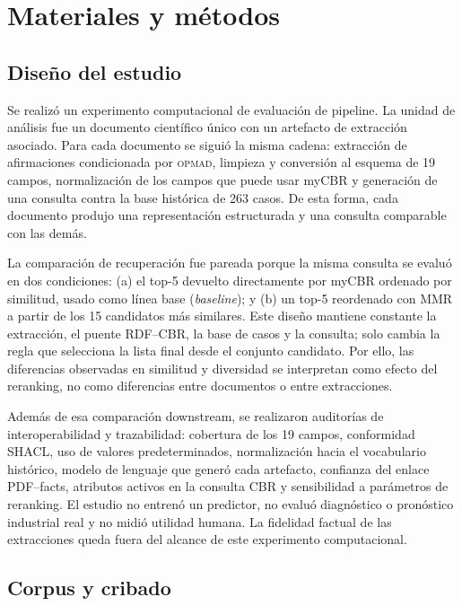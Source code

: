 \documentclass[11pt,a4paper]{article}
\newcommand{\OPMAD}{\textsc{opmad}}
\newcommand{\myCBR}{myCBR}
\begin{document}
\section{Materiales y métodos}
\label{sec:methods}

\subsection{Diseño del estudio}

Se realizó un experimento computacional de evaluación de pipeline. La unidad de análisis fue un documento científico único con un artefacto de extracción asociado. Para cada documento se siguió la misma cadena: extracción de afirmaciones condicionada por \OPMAD{}, limpieza y conversión al esquema de 19 campos, normalización de los campos que puede usar \myCBR{} y generación de una consulta contra la base histórica de 263 casos. De esta forma, cada documento produjo una representación estructurada y una consulta comparable con las demás.

La comparación de recuperación fue pareada porque la misma consulta se evaluó en dos condiciones: (a) el top-5 devuelto directamente por \myCBR{} ordenado por similitud, usado como línea base (\emph{baseline}); y (b) un top-5 reordenado con MMR a partir de los 15 candidatos más similares. Este diseño mantiene constante la extracción, el puente RDF--CBR, la base de casos y la consulta; solo cambia la regla que selecciona la lista final desde el conjunto candidato. Por ello, las diferencias observadas en similitud y diversidad se interpretan como efecto del reranking, no como diferencias entre documentos o entre extracciones.

Además de esa comparación downstream, se realizaron auditorías de interoperabilidad y trazabilidad: cobertura de los 19 campos, conformidad SHACL, uso de valores predeterminados, normalización hacia el vocabulario histórico, modelo de lenguaje que generó cada artefacto, confianza del enlace PDF--facts, atributos activos en la consulta CBR y sensibilidad a parámetros de reranking. El estudio no entrenó un predictor, no evaluó diagnóstico o pronóstico industrial real y no midió utilidad humana. La fidelidad factual de las extracciones queda fuera del alcance de este experimento computacional.

\subsection{Corpus y cribado}
\end{document}

